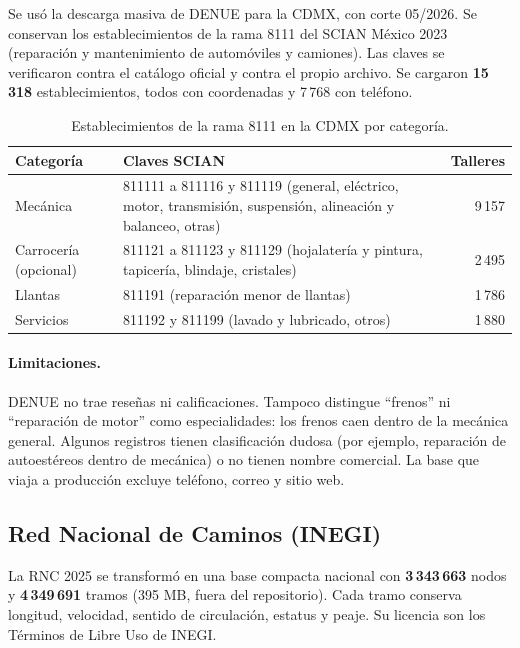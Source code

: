 \documentclass[11pt,a4paper]{article}
\begin{document}
Se usó la descarga masiva de DENUE para la CDMX, con corte 05/2026. Se conservan los
establecimientos de la rama 8111 del SCIAN M\'exico 2023 (reparación y mantenimiento de automóviles
y camiones). Las claves se verificaron contra el catálogo oficial y contra el propio archivo.
Se cargaron \textbf{15\,318} establecimientos, todos con coordenadas y 7\,768 con teléfono.

\begin{table}[h]
\centering
\begin{tabularx}{\textwidth}{@{}l Y r@{}}
\toprule
Categoría & Claves SCIAN & Talleres \\
\midrule
Mecánica   & 811111 a 811116 y 811119 (general, eléctrico, motor, transmisión, suspensión, alineación y balanceo, otras) & 9\,157 \\
Carrocería (opcional) & 811121 a 811123 y 811129 (hojalatería y pintura, tapicería, blindaje, cristales) & 2\,495 \\
Llantas    & 811191 (reparación menor de llantas) & 1\,786 \\
Servicios  & 811192 y 811199 (lavado y lubricado, otros) & 1\,880 \\
\bottomrule
\end{tabularx}
\caption{Establecimientos de la rama 8111 en la CDMX por categoría.}
\end{table}

\paragraph{Limitaciones.} DENUE no trae reseñas ni calificaciones. Tampoco distingue
``frenos'' ni ``reparación de motor'' como especialidades: los frenos caen dentro de la
mecánica general. Algunos registros tienen clasificación dudosa (por ejemplo, reparación de
autoestéreos dentro de mecánica) o no tienen nombre comercial. La base que viaja a producción
excluye teléfono, correo y sitio web.

\subsection{Red Nacional de Caminos (INEGI)}

La RNC 2025 se transformó en una base compacta nacional con \textbf{3\,343\,663} nodos y
\textbf{4\,349\,691} tramos (395 MB, fuera del repositorio). Cada tramo conserva longitud,
velocidad, sentido de circulación, estatus y peaje. Su licencia son los Términos de Libre Uso de INEGI.
\end{document}
